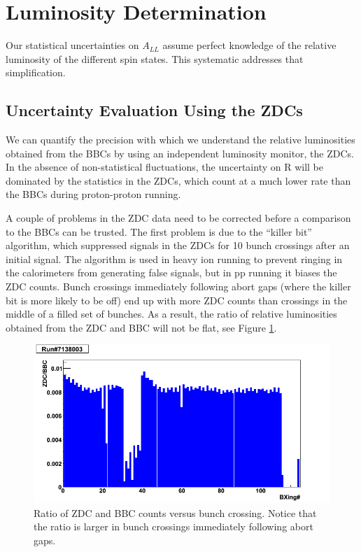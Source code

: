 \section{Luminosity Determination}

Our statistical uncertainties on $A_{LL}$ assume perfect knowledge of the
relative luminosity of the different spin states. This systematic addresses
that simplification.

\subsection{Uncertainty Evaluation Using the ZDCs}


We can quantify the precision with which we understand the relative luminosities
obtained from the BBCs by using an independent luminosity monitor, the ZDCs. In
the absence of non-statistical fluctuations, the uncertainty on R will be
dominated by the statistics in the ZDCs, which count at a much lower rate than
the BBCs during proton-proton running.

A couple of problems in the ZDC data need to be corrected before a comparison
to the BBCs can be trusted. The first problem is due to the ``killer bit''
algorithm, which suppressed signals in the ZDCs for 10 bunch crossings after
an initial signal. The algorithm is used in heavy ion running to prevent
ringing in the calorimeters from generating false signals, but in pp running
it biases the ZDC counts. Bunch crossings immediately following abort gaps
(where the killer bit is more likely to be off) end up with more ZDC counts
than crossings in the middle of a filled set of bunches. As a result, the
ratio of relative luminosities obtained from the ZDC and BBC will not be flat,
see Figure \ref{fig:zdctobbc6170012zoom}.

\begin{figure}
  \includegraphics[width=1.0\textwidth]{figures/ZDCtoBBC_r7138003}
  \caption{Ratio of ZDC and BBC counts versus bunch crossing.  Notice that the ratio is larger in bunch crossings immediately following abort gaps.}
  \label{fig:zdctobbc6170012zoom}
\end{figure}

